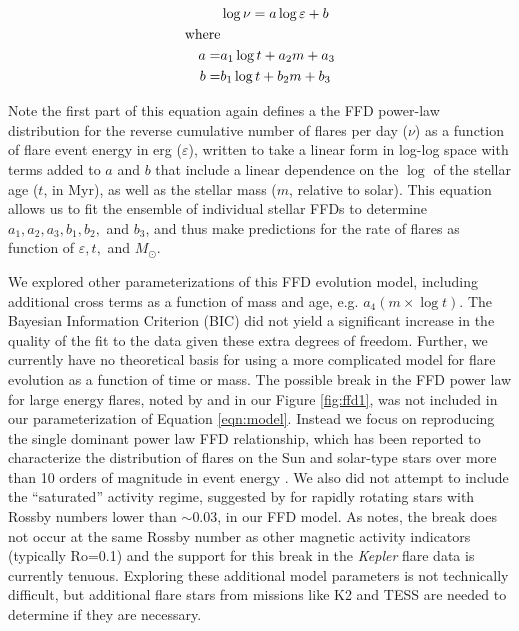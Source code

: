 \documentclass[preprint2]{aastex62}
\newcommand{\Kepler}{\textsl{Kepler}\xspace}
\begin{document}
\begin{eqnarray}
\label{eqn:model}
& \log \nu = a \log \varepsilon + b\\
{\rm where}& \nonumber \\
a =& a_1 \log t + a_2 m + a_3 \nonumber\\
b =& b_1 \log t + b_2 m + b_3 \nonumber 
\end{eqnarray}

\noindent
Note the first part of this equation again defines a the FFD power-law distribution for the reverse cumulative number of flares per day ($\nu$) as a function of flare event energy in erg ($\varepsilon$), written to take a linear form in log-log space with terms added to $a$ and $b$ that include a linear dependence on the $\log$ of the stellar age ($t$, in Myr), as well as the stellar mass ($m$, relative to solar). This equation allows us to fit the ensemble of individual stellar FFDs to determine $a_1, a_2, a_3, b_1, b_2, $ and $b_3$, and thus make predictions for the rate of flares as function of $\varepsilon, t, $ and $M_\odot$.


We explored other parameterizations of this FFD evolution model, including additional cross terms as a function of mass and age, e.g. $a_4 (m \times \log t)$. The Bayesian Information Criterion (BIC) did not yield a significant increase in the quality of the fit to the data given these extra degrees of freedom. Further, we currently have no theoretical basis for using a more complicated model for flare evolution as a function of time or mass. The possible break in the FFD power law for large energy flares, noted by \citet{davenport2016} and in our Figure \ref{fig:ffd1}, was not included in our parameterization of Equation \ref{eqn:model}. Instead we focus on reproducing the single dominant power law FFD relationship, which has been reported to characterize the distribution of flares on the Sun and solar-type stars over more than 10 orders of magnitude in event energy \citep[e.g. Fig. 9 from][]{shibayama2013}. We also did not attempt to include the ``saturated'' activity regime, suggested by \citet{davenport2016} for rapidly rotating stars with Rossby numbers lower than $\sim$0.03, in our FFD model. As \citet{davenport2016} notes, the break does not occur at the same Rossby number as other magnetic activity indicators (typically Ro=0.1) and the support for this break in the \Kepler flare data is currently tenuous. Exploring these additional model parameters is not technically difficult, but additional flare stars from missions like K2 and TESS are needed to determine if they are necessary. 
\end{document}
